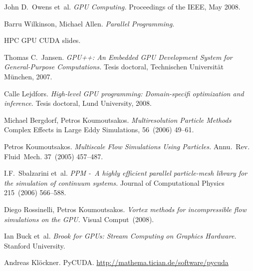\documentclass[11pt,spanish]{article}
\newcommand{\reftitle}{\textit}
\begin{document}
\begin{thebibliography}{99}
    John D.~Owens et~al.
    \reftitle{GPU Computing.}
    Proceedings of the IEEE, May 2008.

    Barru Wilkinson, Michael Allen.
    \reftitle{Parallel Programming.}

    HPC GPU CUDA slides.

    Thomas C.~Jansen.
    \reftitle{GPU++: An Embedded GPU Development System for
      General-Purpose Computations.}
    Tesis doctoral, Technischen Universität München, 2007.

    Calle Lejdfors.
    \reftitle{High-level GPU programming: Domain-specifi optimization and inference.}
    Tesis doctoral, Lund University, 2008.

    Michael Bergdorf, Petros Koumoutsakos.
    \reftitle{Multiresolution Particle Methods}
    Complex Effects in Large Eddy Simulations, 56~(2006) 49--61.

    Petros Koumoutsakos.
    \reftitle{Multiscale Flow Simulations Using Particles.}
    Annu.~Rev. Fluid~Mech. 37~(2005) 457--487.

    I.F.~Sbalzarini et~al.
    \reftitle{PPM -~A highly efficient parallel particle-mesh library
      for the simulation of continuum systems.}
    Journal of Computational Physics 215~(2006) 566--588.

    Diego Rossinelli, Petros Koumoutsakos.
    \reftitle{Vortex methods for incompressible flow simulations on the GPU.}
    Visual Comput~(2008).

    Ian Buck et~al.
    \reftitle{Brook for GPUs: Stream Computing on Graphics Hardware.}
    Stanford University.

    Andreas Klöckner.
    PyCUDA.
    \url{http://mathema.tician.de/software/pycuda}


\end{thebibliography}
\end{document}
